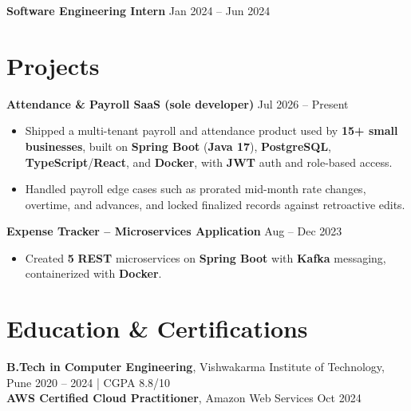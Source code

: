 \documentclass[a4paper,10pt]{article}
\begin{document}
\textbf{Software Engineering Intern} \hfill Jan 2024 -- Jun 2024

\section*{Projects}

\textbf{Attendance \& Payroll SaaS (sole developer)} \hfill Jul 2026 -- Present
\begin{itemize}[leftmargin=*]
    \item Shipped a multi-tenant payroll and attendance product used by \textbf{15+ small businesses}, built on \textbf{Spring Boot} (\textbf{Java 17}), \textbf{PostgreSQL}, \textbf{TypeScript}/\textbf{React}, and \textbf{Docker}, with \textbf{JWT} auth and role-based access.
    \item Handled payroll edge cases such as prorated mid-month rate changes, overtime, and advances, and locked finalized records against retroactive edits.
\end{itemize}

\noindent\textbf{Expense Tracker -- Microservices Application} \hfill Aug -- Dec 2023
\begin{itemize}[leftmargin=*]
    \item Created \textbf{5} \textbf{REST} microservices on \textbf{Spring Boot} with \textbf{Kafka} messaging, containerized with \textbf{Docker}.
\end{itemize}

\section*{Education \& Certifications}
\textbf{B.Tech in Computer Engineering}, Vishwakarma Institute of Technology, Pune \hfill 2020 -- 2024 \;|\; CGPA 8.8/10 \\
\textbf{AWS Certified Cloud Practitioner}, Amazon Web Services \hfill Oct 2024
\end{document}
